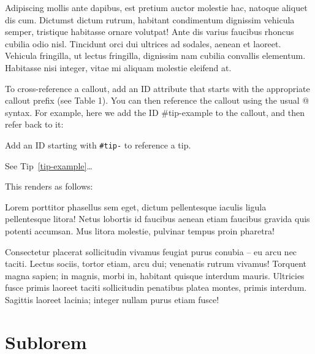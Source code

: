 \documentclass[
  brazilian,
  11pt,
  a4paper,
  open = right,
  twoside = true]{scrbook}
\newcounter{quartocallouttipno}
\newcommand{\quartocallouttip}[1]{\refstepcounter{quartocallouttipno}\label{#1}}
\begin{document}
Adipiscing mollis ante dapibus, est pretium auctor molestie hac, natoque
aliquet dis cum. Dictumst dictum rutrum, habitant condimentum dignissim
vehicula semper, tristique habitasse ornare volutpat! Ante dis varius
faucibus rhoncus cubilia odio nisl. Tincidunt orci dui ultrices ad
sodales, aenean et laoreet. Vehicula fringilla, ut lectus fringilla,
dignissim nam cubilia convallis elementum. Habitasse nisi integer, vitae
mi aliquam molestie eleifend at.

To cross-reference a callout, add an ID attribute that starts with the
appropriate callout prefix (see Table 1). You can then reference the
callout using the usual @ syntax. For example, here we add the ID
\#tip-example to the callout, and then refer back to it:

\begin{tcolorbox}[enhanced jigsaw, arc=.35mm, bottomrule=.15mm, bottomtitle=1mm, breakable, colback=white, colbacktitle=quarto-callout-tip-color!10!white, colframe=quarto-callout-tip-color-frame, coltitle=black, left=2mm, leftrule=.75mm, opacityback=0, opacitybacktitle=0.6, rightrule=.15mm, title=\textcolor{quarto-callout-tip-color}{\faLightbulb}\hspace{0.5em}{Dica \ref*{tip-example}: Cross-Referencing a Tip}, titlerule=0mm, toprule=.15mm, toptitle=1mm]

\quartocallouttip{tip-example} 

Add an ID starting with \texttt{\#tip-} to reference a tip.

\end{tcolorbox}

See Tip~\ref{tip-example}\ldots{}

This renders as follows:

Lorem porttitor phasellus sem eget, dictum pellentesque iaculis ligula
pellentesque litora! Netus lobortis id faucibus aenean etiam faucibus
gravida quis potenti accumsan. Mus litora molestie, pulvinar tempus
proin pharetra!

Consectetur placerat sollicitudin vivamus feugiat purus conubia -- eu
arcu nec taciti. Lectus sociis, tortor etiam, arcu dui; venenatis rutrum
vivamus! Torquent magna sapien; in magnis, morbi in, habitant quisque
interdum mauris. Ultricies fusce primis laoreet taciti sollicitudin
penatibus platea montes, primis interdum. Sagittis laoreet lacinia;
integer nullam purus etiam fusce!

\section{Sublorem}\label{sublorem}
\end{document}
